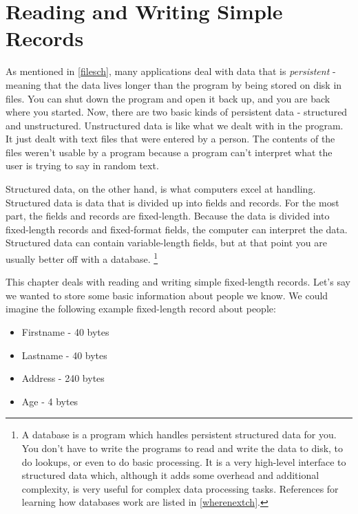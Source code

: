 \chapter{Reading and Writing Simple Records}
\label{records}

As mentioned in \autoref{filesch},
many applications deal with data that is \emph{persistent} - 
meaning that the data lives longer than the program by being stored on disk 
in files.  You can shut down the program and open it back up, and you are
back where you started.  Now, there are two basic kinds of persistent
data - structured and unstructured.  Unstructured data is like what we
dealt with in the  program.  It just dealt with text files that
were entered by a person.  The contents of the files weren't usable by
a program because a program can't interpret what the user is trying to
say in random text.

Structured data, on the other hand, is what computers excel at handling.
Structured data is data that is divided up into fields and records.  For the most
part, the fields and records are fixed-length.  Because the data is
divided into fixed-length records and fixed-format fields, the computer can interpret
the data.  Structured data can contain variable-length fields,
but at that point you are usually better off with a database.
\footnote{A database is a program which handles persistent structured data for you.
You don't have to write the programs to read and write the data to disk,
to do lookups, or even to do basic processing.  It is a very high-level
interface to structured data which, although it adds some overhead and
additional complexity, is very useful for complex data processing tasks.
References for learning how databases work are listed in \autoref{wherenextch}.
}

This chapter deals with reading and writing simple fixed-length records.
Let's say we wanted to store some basic information about people
we know.  We could imagine the following example fixed-length record about people:

\begin{itemize}\item Firstname - 40 bytes 
\item Lastname - 40 bytes 
\item Address - 240 bytes 
\item Age - 4 bytes 
\end{itemize}

